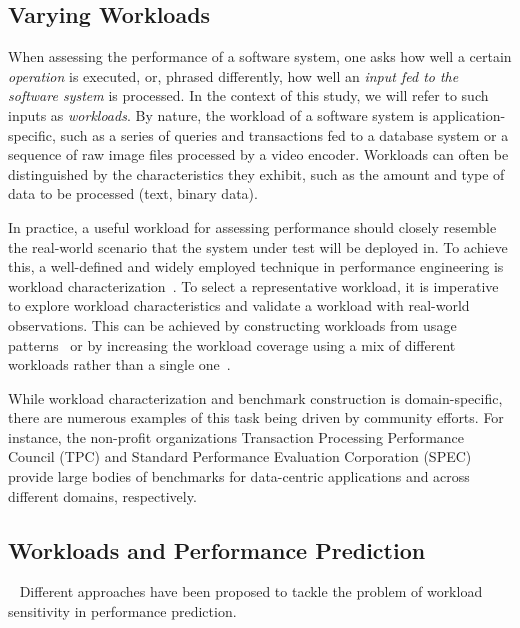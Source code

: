{\color{black}
\subsection{Varying Workloads}\label{sec:varying_workloads}
When assessing the performance of a software system, one asks how well a certain \textit{operation} is executed, or, phrased differently, how well an \textit{input fed to the software system} is processed. 
{In the context of this study, we will refer to such inputs as \textit{workloads}.} By nature, the workload of a software system is application-specific, such as a series of queries and transactions fed to a database system or a sequence of raw image files processed by a video encoder. Workloads can often be distinguished by the characteristics they exhibit, such as the amount and type of data to be processed (text, binary data).

In practice, a useful workload for assessing performance should closely resemble the real-world scenario that the system under test will be deployed in. To achieve this, a well-defined and widely employed technique in performance engineering is workload characterization~\cite{ceesay2020,papadopoulos2021}. To select a representative workload, it is imperative to explore workload characteristics and validate a workload with real-world observations. This can be achieved by constructing workloads from usage patterns~\cite{calzarossa2016} or by increasing the workload coverage using a mix of different workloads rather than a single one~\cite{jiang2015survey}.

While workload characterization and benchmark construction is domain-specific, there are numerous examples of this task being driven by community efforts. For instance, the non-profit organizations Transaction Processing Performance Council (TPC) and Standard Performance Evaluation Corporation (SPEC) provide large bodies of benchmarks for data-centric applications and across different domains, respectively.
	
\subsection{Workloads and Performance Prediction} ~\label{sec:strategies}
Different approaches have been proposed to tackle the problem of workload sensitivity in performance prediction.

}

